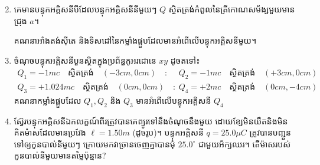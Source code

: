 \begin{enumerate}[m]
\begin{multicols}{2}
\begin{figure}[H]
			\end{figure}
		\end{multicols}
		\item គេមានបន្ទុកអគ្គិសនីបីដែលបន្ទុកអគ្គិសនីនីមួយៗ $Q$ ស្ថិតត្រង់កំពូលនៃត្រីកោណសម័ង្សមួយមានជ្រុង $a$។
		\begin{multicols}{2}
			គណនាអាំងតង់សុីតេ និងទិសដៅនៃកម្លាំងផ្គួបដែលមានអំពើលើបន្ទុកអគ្គិសនីមួយ។
			\begin{figure}[H]
				\centering
			\end{figure}
		\end{multicols}
		\item ចំណុចបន្ទុកអគ្គិសនីបួនស្ថិតក្នុងប្រព័ន្ធកូអរដោនេ $xy$ ដូចតទៅ៖
		\begin{align*}
			Q_{1}=-1mc\quad\text{ស្ថិតត្រង់}\quad (-3cm,0cm)\quad :&\quad
			Q_{2}=-1mc\quad\text{ស្ថិតត្រង់}\quad (+3cm,0cm)\\
			Q_{3}=+1.024mc\quad\text{ស្ថិតត្រង់}\quad (0cm,0cm)\quad :&\quad
			Q_{4}=+2mc\quad\text{ស្ថិតត្រង់}\quad (0cm,-4cm)
		\end{align*}
		គណនាកម្លាំងផ្គួបដែល $Q_{1},Q_{2}$ និង $Q_{3}$ មានអំពើលើបន្ទុកអគ្គិសនី $Q_{4}$
		\item ស៊្វែរបន្ទុកអគ្គិសនីឯកលក្ខណ៍ពីរត្រូវបានគេព្យូរទៅនឹងចំណុចនឹងមួយ ដោយខ្សែមិនយឺតនិងមិនគិតម៉ាសដែលមានប្រវែង $\ell=1.50m$ (ដូចរូប)។ បន្ទុកអគ្គិសនី $q=25.0\mu C$ ត្រូវបានបញ្ជួនទៅឲ្យកូនបាល់នីមួយៗ ក្រោយមកវាច្រានចេញគ្នាបានមុំ $25.0^\circ$ ជាមួយអ័ក្សឈរ។ តើម៉ាសរបស់កូនបាល់នីមួយមានតម្លៃប៉ុន្មាន?

\end{enumerate}
